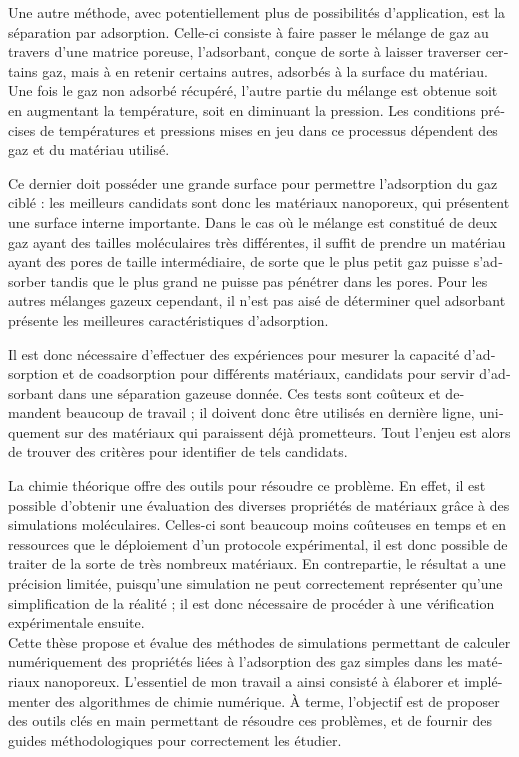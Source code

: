 \documentclass[thesis]{subfiles}
\begin{document}
\begin{otherlanguage}{french}
Une autre méthode, avec potentiellement plus de possibilités d'application, est la séparation par adsorption. Celle-ci consiste à faire passer le mélange de gaz au travers d'une matrice poreuse, l'adsorbant, conçue de sorte à laisser traverser certains gaz, mais à en retenir certains autres, adsorbés à la surface du matériau. Une fois le gaz non adsorbé récupéré, l'autre partie du mélange est obtenue soit en augmentant la température, soit en diminuant la pression. Les conditions précises de températures et pressions mises en jeu dans ce processus dépendent des gaz et du matériau utilisé.

Ce dernier doit posséder une grande surface pour permettre l'adsorption du gaz ciblé : les meilleurs candidats sont donc les matériaux nanoporeux, qui présentent une surface interne importante. Dans le cas où le mélange est constitué de deux gaz ayant des tailles moléculaires très différentes, il suffit de prendre un matériau ayant des pores de taille intermédiaire, de sorte que le plus petit gaz puisse s'adsorber tandis que le plus grand ne puisse pas pénétrer dans les pores. Pour les autres mélanges gazeux cependant, il n'est pas aisé de déterminer quel adsorbant présente les meilleures caractéristiques d'adsorption.

Il est donc nécessaire d'effectuer des expériences pour mesurer la capacité d'adsorption et de coadsorption pour différents matériaux, candidats pour servir d'adsorbant dans une séparation gazeuse donnée. Ces tests sont coûteux et demandent beaucoup de travail ; il doivent donc être utilisés en dernière ligne, uniquement sur des matériaux qui paraissent déjà prometteurs. Tout l'enjeu est alors de trouver des critères pour identifier de tels candidats.

La chimie théorique offre des outils pour résoudre ce problème. En effet, il est possible d'obtenir une évaluation des diverses propriétés de matériaux grâce à des simulations moléculaires. Celles-ci sont beaucoup moins coûteuses en temps et en ressources que le déploiement d'un protocole expérimental, il est donc possible de traiter de la sorte de très nombreux matériaux. En contrepartie, le résultat a une précision limitée, puisqu'une simulation ne peut correctement représenter qu'une simplification de la réalité ; il est donc nécessaire de procéder à une vérification expérimentale ensuite.\\

Cette thèse propose et évalue des méthodes de simulations permettant de calculer numériquement des propriétés liées à l'adsorption des gaz simples dans les matériaux nanoporeux. L'essentiel de mon travail a ainsi consisté à élaborer et implémenter des algorithmes de chimie numérique. À terme, l'objectif est de proposer des outils clés en main permettant de résoudre ces problèmes, et de fournir des guides méthodologiques pour correctement les étudier.


\end{otherlanguage}
\end{document}

